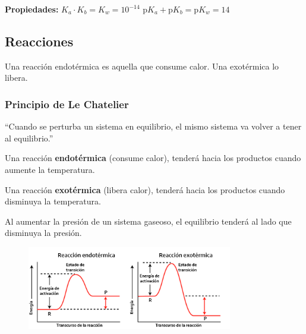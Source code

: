 \vspace{\baselineskip}
\noindent
\textbf{Propiedades:}
\hfil
$K_a \cdot K_b = K_w = 10^{-14}$
\hfil
$\text{p}K_a + \text{p}K_b = \text{p}K_w = 14$
\hfil


\newpage
\subsection*{Reacciones}

Una reacción endotérmica es aquella que consume calor. Una exotérmica lo libera.


\subsubsection*{Principio de Le Chatelier}

``Cuando se perturba un sistema en equilibrio, el mismo sistema va volver a tener al equilibrio.''

Una reacción \textbf{endotérmica} (consume calor), tenderá hacia los productos cuando aumente la temperatura.

Una reacción \textbf{exotérmica} (libera calor), tenderá hacia los productos cuando disminuya la temperatura.

Al aumentar la presión de un sistema gaseoso, el equilibrio tenderá al lado que disminuya la presión.

\begin{figure}[H]
    \centering
    \includegraphics[width=0.8\textwidth]{Images/energia-activacion.png}
\end{figure}
